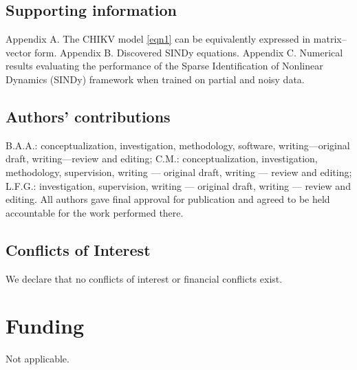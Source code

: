 \documentclass[9pt]{article}
\numberwithin{equation}{section}
\begin{document}
\subsection*{Supporting information}
Appendix A. The CHIKV model \eqref{eqn1} can be equivalently expressed in matrix--vector form. Appendix B. Discovered SINDy equations. Appendix C. Numerical results evaluating the performance of the Sparse Identification of Nonlinear Dynamics (SINDy) framework when trained on partial and noisy data.
\subsection*{Authors' contributions}
B.A.A.: conceptualization, investigation, methodology, software, writing—original draft, writing—review and editing; C.M.: conceptualization, investigation, methodology, supervision, writing — original draft, writing — review and editing; L.F.G.: investigation, supervision, writing — original draft, writing — review and editing. All authors gave final approval for publication and agreed to be held accountable for the work performed there.
\subsection*{Conflicts of Interest}
We declare that no conflicts of interest or financial conflicts exist.
\section*{Funding}
Not applicable.

\appendix
\end{document}
